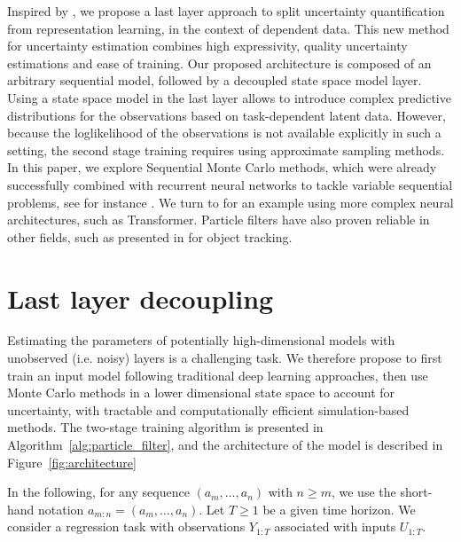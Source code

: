 \documentclass[journal]{IEEEtran}
\begin{document}
Inspired by \cite{Brosse2020OnLA}, we propose a last layer approach to split uncertainty quantification from representation learning, in the context of dependent data. This new method for uncertainty estimation combines high expressivity, quality uncertainty estimations and ease of training. Our proposed architecture is composed of an arbitrary sequential model, followed by a decoupled state space model layer. Using a state space model in the last layer allows to introduce complex predictive distributions for the observations based on task-dependent latent data. However, because the loglikelihood of the observations is not available explicitly in such a setting, the second stage training requires using approximate sampling methods. In this paper, we explore Sequential Monte Carlo methods, which were already successfully combined with recurrent neural networks to tackle variable sequential problems, see for instance \cite{naesseth2017variational,maddison2017filtering,Ma2020}.
We turn to \cite{Martin2020TheMC} for an example using more complex neural architectures, such as Transformer.
Particle filters have also proven reliable in other fields, such as presented in \cite{Liu2020LSTMPF} for object tracking.




\section{Last layer decoupling}
Estimating the parameters of potentially high-dimensional models with unobserved (i.e. noisy) layers is a challenging task.
We therefore propose to first train an input model following traditional deep learning approaches, then use Monte Carlo methods in a lower dimensional state space to account for uncertainty, with tractable and computationally efficient simulation-based methods.
The two-stage training algorithm is presented in Algorithm~\ref{alg:particle_filter}, and the architecture of the model is described in Figure~\ref{fig:architecture}

In the following, for any sequence $(a_m,\ldots, a_n)$ with $n\geq m$, we use the short-hand notation $a_{m:n} = (a_m,\ldots, a_n)$.
Let $T\ge 1$ be a given time horizon.
We consider a regression task with observations $Y_{1:T}$ associated with inputs $U_{1:T}$.
\end{document}
